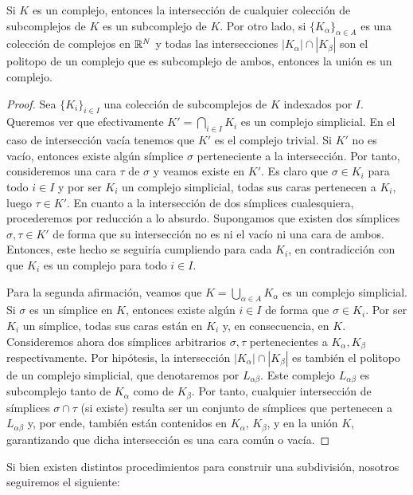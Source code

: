 \begin{lema}
	\label{lem:compl-cons}
	Si $K$ es un complejo, entonces la intersección de cualquier colección de subcomplejos de $K$ es un subcomplejo de $K$. Por otro lado, si $\{K_{\alpha}\}_{\alpha \in A}$ es una colección de complejos en $\mathbb{R}^N$ y todas las intersecciones $|K_{\alpha}| \cap |K_{\beta}|$ son el politopo de un complejo que es subcomplejo de ambos, entonces la unión es un complejo.
\end{lema}
\begin{proof}
	Sea $\{K_i\}_{i \in I}$ una colección de subcomplejos de $K$ indexados por $I$. Queremos ver que efectivamente $K' = \bigcap_{i \in I} K_i$ es un complejo simplicial. En el caso de intersección vacía tenemos que $K'$ es el complejo trivial. Si $K'$ no es vacío, entonces existe algún símplice $\sigma$ perteneciente a la intersección. Por tanto, consideremos una cara $\tau$ de $\sigma$ y veamos existe en $K'$. Es claro que $\sigma \in K_i$ para todo $i \in I$ y por ser $K_i$ un complejo simplicial, todas sus caras pertenecen a $K_i$, luego $\tau \in K'$. En cuanto a la intersección de dos símplices cualesquiera, procederemos por reducción a lo absurdo. Supongamos que existen dos símplices $\sigma, \tau \in K'$ de forma que su intersección no es ni el vacío ni una cara de ambos. Entonces, este hecho se seguiría cumpliendo para cada $K_i$, en contradicción con que $K_i$ es un complejo para todo $i \in I$.
	
	Para la segunda afirmación, veamos que $K = \bigcup_{\alpha \in A} K_\alpha$ es un complejo simplicial. Si $\sigma$ es un símplice en $K$, entonces existe algún $i \in I$ de forma que $\sigma \in K_i$. Por ser $K_i$ un símplice, todas sus caras están en $K_i$ y, en consecuencia, en $K$. Consideremos ahora dos símplices arbitrarios \(\sigma, \tau\) pertenecientes a \(K_{\alpha}, K_{\beta}\) respectivamente. Por hipótesis, la intersección  \(|K_\alpha| \cap |K_\beta|\) es también el politopo de un complejo simplicial, que denotaremos por \(L_{\alpha \beta}\). Este complejo \(L_{\alpha \beta}\) es subcomplejo tanto de \(K_\alpha\) como de \(K_\beta\). Por tanto, cualquier intersección de símplices \(\sigma \cap \tau\) (si existe) resulta ser un conjunto de símplices que pertenecen a \(L_{\alpha \beta}\) y, por ende, también están contenidos en \(K_{\alpha}\), \(K_{\beta}\), y en la unión \(K\), garantizando que dicha intersección es una cara común o vacía.
\end{proof}

Si bien existen distintos procedimientos para construir una subdivisión, nosotros seguiremos el siguiente:
 
